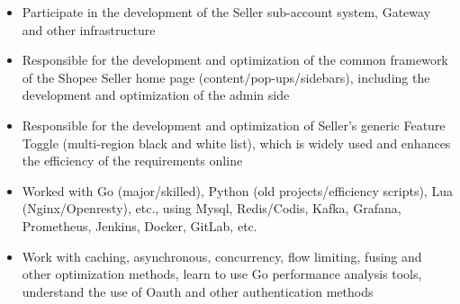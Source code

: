 \documentclass{resume}
\newcommand{\en}[1]{#1}
\newcommand{\zh}[1]{}
\begin{document}
\en{}
\zh{\datedsubsection{\textbf{\href{https://www.sea.com/products/shopee/}{深圳虾皮信息科技发展有限公司}}}{2021/07 -- Present}}
\en{}
\zh{\role{卖家平台}{后端软件工程师}}
\begin{itemize}[parsep=0.5ex]
      \item \en{Participate in the development of the Seller sub-account system, Gateway and other infrastructure}
            \zh{参与 Seller 主子账号系统、Gateway 等基础设施的开发}
      \item \en{Responsible for the development and optimization of the common framework of the Shopee Seller home page (content/pop-ups/sidebars), including the development and optimization of the admin side}
            \zh{负责 Shopee Seller 主站首页(内容/弹窗/侧边栏)等通用框架的开发和优化,包括 admin 端的开发优化}
      \item \en{Responsible for the development and optimization of Seller's generic Feature Toggle (multi-region black and white list), which is widely used and enhances the efficiency of the requirements online}
            \zh{负责 Seller 通用 Feature Toggle 的开发和优化(多地区黑白名单),使用广泛,提升了需求的上线效率}
      \item \en{Worked with Go (major/skilled), Python (old projects/efficiency scripts), Lua (Nginx/Openresty), etc., using Mysql, Redis/Codis, Kafka, Grafana, Prometheus, Jenkins, Docker, GitLab, etc.}
            \zh{工作期间使用 Go(主要/熟练)、Python(旧项目/效率脚本)、Lua(Nginx/Openresty)等,使用 Mysql、Redis/Codis、Kafka、Grafana、Prometheus、Jenkins、Docker、GitLab 等}
      \item \en{Work with caching, asynchronous, concurrency, flow limiting, fusing and other optimization methods, learn to use Go performance analysis tools, understand the use of Oauth and other authentication methods}
            \zh{工作中接触缓存、异步、并发、限流、熔断等优化方式,学会使用 Go 性能分析工具,了解使用 Oauth 等认证方式}
\end{itemize}
\end{document}
